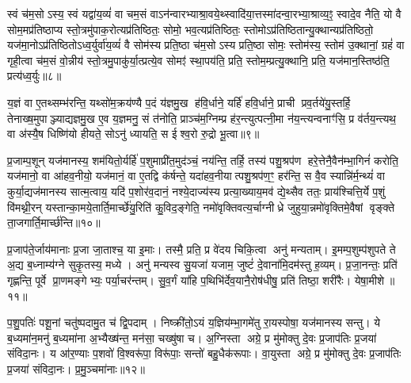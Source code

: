 स्वं च॑म॒सोऽस्य॒ स्वं यद्वा॑य॒व्यं॑ वा चम॒सं वाऽन॑न्वारभ्याश्रा॒वये॒थ्स्वादि॑या॒त्तस्मा॑दन्वा॒रभ्या॒श्राव्य॒ꣵ॒ स्वादे॒व नैति॒ यो वै सोम॒मप्र॑तिष्ठाप्य स्तो॒त्रमु॑पाक॒रोत्यप्र॑तिष्ठितः॒ सोमो॒ भव॒त्यप्र॑तिष्ठितः॒ स्तोमोऽप्र॑तिष्ठितान्यु॒क्थान्यप्र॑तिष्ठितो॒ यज॑मा॒नोऽप्र॑तिष्ठितोऽध्व॒र्युर्वा॑य॒व्यं॑ वै सोम॑स्य प्रति॒ष्ठा च॑म॒सोऽस्य प्रति॒ष्ठा सोमः॒ स्तोम॑स्य॒ स्तोम॑ उ॒क्थानां॒ ग्रहं॑ वा गृही॒त्वा च॑म॒सं वो॒न्नीय॑ स्तो॒त्रमु॒पाकु॑र्या॒त्प्रत्ये॒व सोमꣵ॑ स्था॒पय॑ति॒ प्रति॒ स्तोम॒म्प्रत्यु॒क्थानि॒ प्रति॒ यज॑मान॒स्तिष्ठ॑ति॒ प्रत्य॑ध्व॒र्युः॥८॥

{\anuvakamend[{ए॒व ति॑ष्ठति॒ यो वा॑य॒व्य॑मस्य॒ ग्रहं॒ वैका॒न्नविꣳ॑श॒तिश्च॑॥२॥}]}

य॒ज्ञं वा ए॒तथ्सम्भ॑रन्ति॒ यथ्सो॑म॒क्रय॑ण्यै प॒दं य॑ज्ञमु॒ख ह॑वि॒र्धाने॒ यर्\mbox{}हि॑ हवि॒र्धाने॒ प्राची प्रव॒र्तये॑यु॒स्तर्\mbox{}हि॒ तेनाख्ष॒मुपाञ्ज्याद्यज्ञमु॒ख ए॒व य॒ज्ञमनु॒ सं त॑नोति॒ प्राञ्च॑म॒ग्निम्प्र ह॑र॒न्त्युत्पत्नी॒मा न॑य॒न्त्यन्वनाꣳ॑सि॒ प्र व॑र्तय॒न्त्यथ॒ वा अ॑स्यै॒ष धिष्णि॑यो हीयते॒ सोऽनु॑ ध्यायति॒ स ईश्व॒रो रु॒द्रो भू॒त्वा॥९॥

प्र॒जाम्प॒शून् यज॑मानस्य॒ शम॑यितो॒र्यर्\mbox{}हि॑ प॒शुमाप्री॑त॒मुद॑ञ्चं॒ नय॑न्ति॒ तर्\mbox{}हि॒ तस्य॑ पशु॒श्रप॑ण हरे॒त्तेनै॒वैन॑म्भा॒गिनं॑ करोति॒ यज॑मानो॒ वा आ॑हव॒नीयो॒ यज॑मानं॒ वा ए॒तद्वि क॑र्\mbox{}षन्ते॒ यदा॑हव॒नीयात्पशु॒श्रप॑ण॒ꣳ॒ हर॑न्ति॒ स वै॒व स्यान्नि॑र्म॒न्थ्यं॑ वा कुर्या॒द्यज॑मानस्य सात्म॒त्वाय॒ यदि॑ प॒शोर॑व॒दानं॒ नश्ये॒दाज्य॑स्य प्रत्या॒ख्याय॒मव॑ द्ये॒थ्सैव ततः॒ प्राय॑श्चित्ति॒र्ये प॒शुं वि॑मथ्नी॒रन् यस्तान्का॒मये॒तार्ति॒मार्च्छे॑यु॒रिति॑ कु॒विद॒ङ्गेति॒ नमो॑वृक्तिवत्य॒र्चाग्नीध्रे जुहुया॒न्नमो॑वृक्तिमे॒वैषां वृङ्क्ते ता॒जगार्ति॒मार्च्छ॑न्ति॥१०॥

{\anuvakamend[{भू॒त्वा तत॒ष्षड्विꣳ॑शतिश्च॥३॥}]}

प्र॒जाप॑ते॒र्जाय॑मानाः प्र॒जा जा॒ताश्च॒ या इ॒माः। तस्मै॒ प्रति॒ प्र वे॑दय चिकि॒त्वा अनु॑ मन्यताम्। इ॒मम्प॒शुम्प॑शुपते ते अ॒द्य ब॒ध्नाम्य॑ग्ने सुकृ॒तस्य॒ मध्ये। अनु॑ मन्यस्व सु॒यजा॑ यजाम॒ जुष्टं॑ दे॒वाना॑मि॒दम॑स्तु ह॒व्यम्। प्र॒जा॒नन्तः॒ प्रति॑ गृह्णन्ति॒ पूर्वे प्रा॒णमङ्गेभ्यः॒ पर्या॒चर॑न्तम्। सु॒व॒र्गं या॑हि प॒थिभि॑र्देव॒यानै॒रोष॑धीषु॒ प्रति॑ तिष्ठा॒ शरी॑रैः। येषा॒मीशे॥११॥

प॒शु॒पतिः॑ पशू॒नां चतु॑ष्पदामु॒त च॑ द्वि॒पदाम्। निष्क्री॑तो॒ऽयं य॒ज्ञिय॑म्भा॒गमे॑तु रा॒यस्पोषा॒ यज॑मानस्य सन्तु। ये ब॒ध्यमा॑न॒मनु॑ ब॒ध्यमा॑ना अ॒भ्यैख्ष॑न्त॒ मन॑सा॒ चख्षु॑षा च। अ॒ग्निस्ता अग्रे॒ प्र मु॑मोक्तु दे॒वः प्र॒जाप॑तिः प्र॒जया॑ संविदा॒नः। य आ॑र॒ण्याः प॒शवो॑ वि॒श्वरू॑पा॒ विरू॑पाः॒ सन्तो॑ बहु॒धैक॑रूपाः। वा॒युस्ता अग्रे॒ प्र मु॑मोक्तु दे॒वः प्र॒जाप॑तिः प्र॒जया॑ संविदा॒नः। प्र॒मु॒ञ्चमा॑नाः॥१२॥

